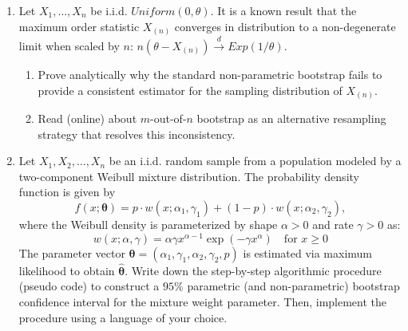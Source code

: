 \documentclass[12pt]{article}%
\begin{document}
\begin{enumerate}[leftmargin=*]

   \item Let $X_1, \dots, X_n$ be i.i.d. $Uniform(0, \theta)$. It is a known
      result that the maximum order statistic $X_{(n)}$ converges in
      distribution to a non-degenerate limit when scaled by $n$: $n(\theta -
      X_{(n)}) \xrightarrow{d} Exp(1/\theta)$. 
      \begin{enumerate}
         \item[(a)] Prove analytically why the standard non-parametric bootstrap
            fails to provide a consistent estimator for the sampling
            distribution of $X_{(n)}$. 
         \item[(b)] Read (online) about $m$-out-of-$n$ bootstrap as an
            alternative resampling strategy that resolves this inconsistency.
      \end{enumerate}

   \item Let $X_1, X_2, \dots, X_n$ be an i.i.d. random sample from a population
      modeled by a two-component Weibull mixture distribution. The probability
      density function is given by 
      $$f(x; \boldsymbol{\theta}) = p \cdot w(x; \alpha_1,
      \gamma_1) + (1-p) \cdot w(x; \alpha_2, \gamma_2),$$
      where the Weibull density is parameterized by shape $\alpha > 0$ and rate
      $\gamma > 0$ as:
      $$w(x; \alpha, \gamma) = \alpha \gamma x^{\alpha-1} \exp(-\gamma x^\alpha)
      \quad \text{for } x \ge 0$$
      The parameter vector $\boldsymbol{\theta} = (\alpha_1, \gamma_1, \alpha_2,
      \gamma_2, p)$ is estimated via maximum likelihood to obtain
      $\boldsymbol{\hat{\theta}}$.
      Write down the step-by-step algorithmic
      procedure (pseudo code) to construct a $95\%$ parametric (and
      non-parametric) bootstrap confidence interval for the mixture weight
      parameter. Then, implement the procedure using a language of your choice.

\end{enumerate}
\end{document}
